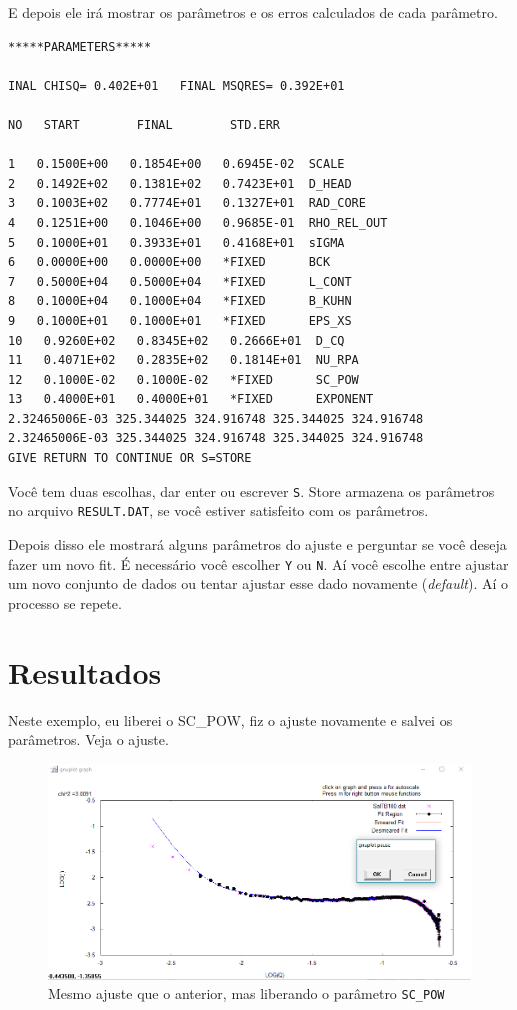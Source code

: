 \begin{apendicesenv}
E depois ele irá mostrar os parâmetros e os erros calculados de cada parâmetro.

\begin{samepage}
\begin{verbatim}
*****PARAMETERS*****

INAL CHISQ= 0.402E+01   FINAL MSQRES= 0.392E+01

NO   START        FINAL        STD.ERR

1   0.1500E+00   0.1854E+00   0.6945E-02  SCALE
2   0.1492E+02   0.1381E+02   0.7423E+01  D_HEAD
3   0.1003E+02   0.7774E+01   0.1327E+01  RAD_CORE
4   0.1251E+00   0.1046E+00   0.9685E-01  RHO_REL_OUT
5   0.1000E+01   0.3933E+01   0.4168E+01  sIGMA
6   0.0000E+00   0.0000E+00   *FIXED      BCK
7   0.5000E+04   0.5000E+04   *FIXED      L_CONT
8   0.1000E+04   0.1000E+04   *FIXED      B_KUHN
9   0.1000E+01   0.1000E+01   *FIXED      EPS_XS
10   0.9260E+02   0.8345E+02   0.2666E+01  D_CQ
11   0.4071E+02   0.2835E+02   0.1814E+01  NU_RPA
12   0.1000E-02   0.1000E-02   *FIXED      SC_POW
13   0.4000E+01   0.4000E+01   *FIXED      EXPONENT
2.32465006E-03 325.344025 324.916748 325.344025 324.916748
2.32465006E-03 325.344025 324.916748 325.344025 324.916748
GIVE RETURN TO CONTINUE OR S=STORE
\end{verbatim}
\end{samepage}

Você tem duas escolhas, dar enter ou escrever \texttt{S}. Store armazena os parâmetros no arquivo \texttt{RESULT.DAT}, se você estiver satisfeito com os parâmetros.

Depois disso ele mostrará alguns parâmetros do ajuste e perguntar se você deseja fazer um novo fit. É necessário você escolher \texttt{Y} ou \texttt{N}. Aí você escolhe entre ajustar um novo conjunto de dados ou tentar ajustar esse dado novamente (\textit{default}). Aí o processo se repete.

\section{Resultados}

Neste exemplo, eu liberei o SC\_POW, fiz o ajuste novamente e salvei os parâmetros. Veja o ajuste.

\begin{figure}
	\centering
	\includegraphics[scale=0.5]{./imagens/saxs/supersaxs_gnuplot_fit2}
	\caption{Mesmo ajuste que o anterior, mas liberando o parâmetro \texttt{SC\_POW}}
\end{figure}


\end{apendicesenv}
